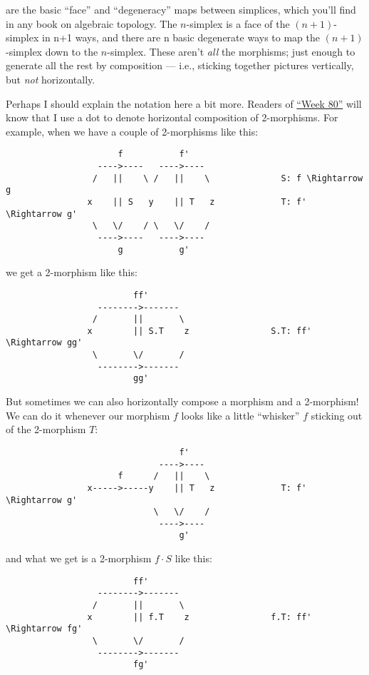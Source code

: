 \documentclass{article}
\begin{document}
are the basic ``face'' and ``degeneracy'' maps between simplices, which
you'll find in any book on algebraic topology. The \(n\)-simplex is a
face of the \((n+1)\)-simplex in n+1 ways, and there are n basic
degenerate ways to map the \((n+1)\)-simplex down to the \(n\)-simplex.
These aren't \emph{all} the morphisms; just enough to generate all the
rest by composition --- i.e., sticking together pictures vertically, but
\emph{not} horizontally.

Perhaps I should explain the notation here a bit more. Readers of
\protect\hyperlink{week80}{``Week 80''} will know that I use a dot to
denote horizontal composition of 2-morphisms. For example, when we have
a couple of 2-morphisms like this:

\begin{verbatim}
                      f           f'
                  ---->----   ---->----  
                 /   ||    \ /   ||    \              S: f \Rightarrow g
                x    || S   y    || T   z             T: f' \Rightarrow g'
                 \   \/    / \   \/    /
                  ---->----   ---->----
                      g           g'
\end{verbatim}

we get a 2-morphism like this:

\begin{verbatim}
                         ff'
                  -------->-------
                 /       ||       \
                x        || S.T    z                S.T: ff' \Rightarrow gg'
                 \       \/       /
                  -------->-------
                         gg'
\end{verbatim}

But sometimes we can also horizontally compose a morphism and a
2-morphism! We can do it whenever our morphism \(f\) looks like a little
``whisker'' \(f\) sticking out of the 2-morphism \(T\):

\begin{verbatim}
                                  f'
                              ---->----  
                      f      /   ||    \              
                x----->-----y    || T   z             T: f' \Rightarrow g'
                             \   \/    /
                              ---->----
                                  g'
\end{verbatim}

and what we get is a 2-morphism \(f\cdot S\) like this:

\begin{verbatim}
                         ff'
                  -------->-------
                 /       ||       \
                x        || f.T    z                f.T: ff' \Rightarrow fg'
                 \       \/       /
                  -------->-------
                         fg'
\end{verbatim}
\end{document}
